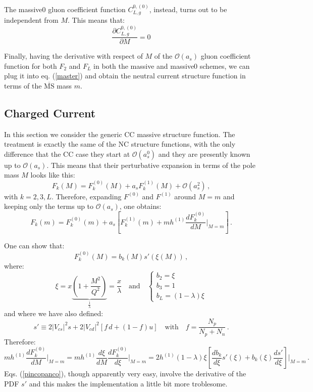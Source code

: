 \documentclass[10pt,a4paper]{article}
\begin{document}
The massive0 gluon coefficient function $C_{L,g}^{0,(0)}$, instead, turns out to be independent from $M$. This means that:
\begin{equation}
\frac{\partial C_{L,g}^{0,(0)}}{\partial M}= 0
\end{equation}

Finally, having the derivative with respect of $M$ of the $\mathcal{O}(a_s)$ gluon coefficient function for both $F_2$ and $F_L$ in both the massive and massive0 schemes, we can plug it into eq. (\ref{master}) and obtain the neutral current structure function in terms of the $\overline{\mbox{MS}}$ mass $m$.

\subsection{Charged Current}

In this section we consider the generic CC massive structure function. The treatment is exactly the same of the NC structure functions, with the only difference that the CC case they start at $\mathcal{O}(a_s^0)$ and they are presently known up to $\mathcal{O}(a_s)$. This means that their perturbative expansion in terms of the pole mass $M$ looks like this:
\begin{equation}
F_k(M) = F_k^{(0)}(M) + a_sF_k^{(1)}(M) + \mathcal{O}(a_s^2)\,,
\end{equation}
with $k=2,3,L$. Therefore, expanding $F^{(0)}$ and $F^{(1)}$ around $M=m$ and keeping only the terms up to $\mathcal{O}(a_s)$, one obtains:
\begin{equation}\label{gigi}
F_k(m) = F_k^{(0)}(m) + a_s\left[F_k^{(1)}(m)+mh^{(1)}\frac{dF_k^{(0)}}{dM}\bigg|_{M=m}\right]\,.
\end{equation}

One can show that:
\begin{equation}
F^{(0)}_k(M) = b_k(M)s'(\xi(M))\,,
\end{equation}
where:
\begin{equation}\label{definitions}
\xi = x\underbrace{\left(1+\frac{M^2}{Q^2}\right)}_{\frac1\lambda}=\frac{x}\lambda\quad\mbox{and}\quad
\left\{\begin{array}{l}
b_2 = \xi\\
b_3 = 1\\
b_L = (1-\lambda)\xi
\end{array}
\right.
\end{equation}
and where we have also defined:
\begin{equation}
s'\equiv 2|V_{cs}|^2s+2|V_{cd}|^2[f\,d+(1-f)u]\quad\mbox{with}\quad f=\frac{N_p}{N_p+N_n}\,.
\end{equation}
Therefore:
\begin{equation}\label{pincopanco}
mh^{(1)}\frac{dF^{(0)}_k}{dM}\bigg|_{M=m} = mh^{(1)}\frac{d\xi}{dM}\frac{dF^{(0)}_k}{d\xi}\bigg|_{M=m} = 2h^{(1)}(1-\lambda)\xi\left[\frac{db_k}{d\xi}s'(\xi)+b_k(\xi)\frac{ds'}{d\xi}\right]\bigg|_{M=m}\,.
\end{equation}
Eqs. (\ref{pincopanco}), though apparently very easy, involve the derivative of the PDF $s'$ and this makes the implementation a little bit more troblesome.
\end{document}
